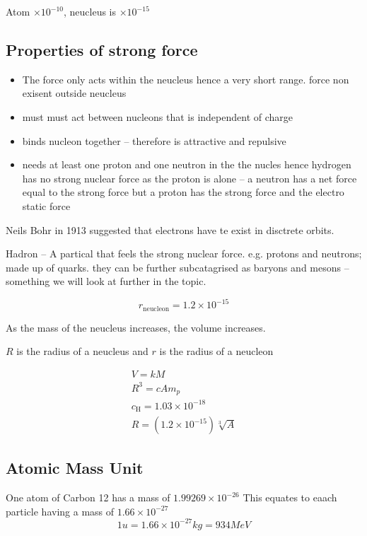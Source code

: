 \documentclass{article}
\begin{document}
Atom $\times 10^{-10}$, neucleus is $\times 10^{-15}$

\subsection{Properties of strong force}

\begin{itemize}
	\item The force only acts within the neucleus hence a very short range.
		force non exisent outside neucleus
	\item must must act between nucleons that is independent of charge
	\item binds nucleon together -- therefore is attractive and repulsive
	\item needs at least one proton and one neutron in the the nucles hence
		hydrogen has no strong nuclear force as the proton is alone
		-- a neutron has a net force equal to the strong force but a proton has
		the strong force and the electro static force
\end{itemize}

Neils Bohr in 1913 suggested that electrons have te exist in disctrete orbits.


Hadron -- A partical that feels the strong nuclear force. e.g. protons and neutrons; made up of quarks.
they can be further subcatagrised as baryons and mesons -- something we will look at further in the topic.

\begin{equation}
	r_\text{neucleon} = 1.2 \times 10^{-15}
\end{equation}

As the mass of the neucleus increases, the volume increases.

$R$ is the radius of a neucleus and $r$ is the radius of a neucleon

\begin{gather}
	V = kM \\
	R^3 = cAm_p \\
	c_\text{H} = 1.03 \times 10^{-18} \\
	R = (1.2 \times 10^{-15}) \sqrt[3]{A}
\end{gather}

\subsection{Atomic Mass Unit}

One atom of Carbon 12 has a mass of $1.99269\times 10^{-26}$
This equates to eaach particle having a mass of $1.66\times 10^{-27}$
\begin{equation}
	1\si{u} = 1.66 \times 10^{-27} \si{kg} = 934 \si{MeV}
\end{equation}
\end{document}
